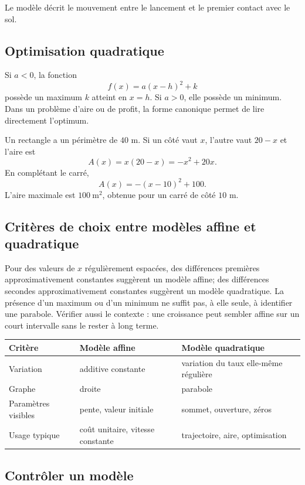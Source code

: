 Le modèle décrit le mouvement entre le lancement et le premier contact avec le sol.

\subsection{Optimisation quadratique}

Si $a<0$, la fonction
\[
f(x)=a(x-h)^2+k
\]
possède un maximum $k$ atteint en $x=h$. Si $a>0$, elle possède un minimum. Dans un problème d'aire ou de profit, la forme canonique permet de lire directement l'optimum.

\begin{examplebox}
Un rectangle a un périmètre de $40$ m. Si un côté vaut $x$, l'autre vaut $20-x$ et l'aire est
\[
A(x)=x(20-x)=-x^2+20x.
\]
En complétant le carré,
\[
A(x)=-(x-10)^2+100.
\]
L'aire maximale est $100\ \mathrm{m}^2$, obtenue pour un carré de côté $10$ m.
\end{examplebox}

\subsection{Critères de choix entre modèles affine et quadratique}

Pour des valeurs de $x$ régulièrement espacées, des différences premières approximativement constantes suggèrent un modèle affine; des différences secondes approximativement constantes suggèrent un modèle quadratique. La présence d'un maximum ou d'un minimum ne suffit pas, à elle seule, à identifier une parabole. Vérifier aussi le contexte : une croissance peut sembler affine sur un court intervalle sans le rester à long terme.

\begin{center}
\begin{tabularx}{\textwidth}{@{}lYY@{}}
\toprule
Critère & Modèle affine & Modèle quadratique\\\midrule
Variation & additive constante & variation du taux elle-même régulière\\
Graphe & droite & parabole\\
Paramètres visibles & pente, valeur initiale & sommet, ouverture, zéros\\
Usage typique & coût unitaire, vitesse constante & trajectoire, aire, optimisation\\
\bottomrule
\end{tabularx}
\end{center}

\subsection{Contrôler un modèle}

